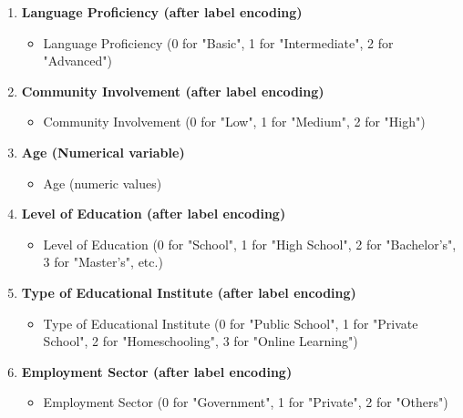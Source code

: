 \documentclass[conference]{IEEEtran}
\begin{document}
\begin{enumerate}[itemsep=0pt, parsep=0pt, topsep=0pt, partopsep=0pt]
    \item \textbf{Language Proficiency (after label encoding)}  
\begin{itemize}[itemsep=0pt, parsep=0pt, topsep=0pt, partopsep=0pt]
  \item  Language Proficiency (0 for "Basic", 1 for "Intermediate", 2 for "Advanced") 
\end{itemize}
    \item \textbf{Community Involvement (after label encoding)}  
\begin{itemize}[itemsep=0pt, parsep=0pt, topsep=0pt, partopsep=0pt]
  \item Community Involvement (0 for "Low", 1 for "Medium", 2 for "High") 
\end{itemize}
    \item \textbf{Age (Numerical variable)}  
\begin{itemize}[itemsep=0pt, parsep=0pt, topsep=0pt, partopsep=0pt]
  \item Age (numeric values)  
\end{itemize}
    \item \textbf{Level of Education (after label encoding)}  
\begin{itemize}[itemsep=0pt, parsep=0pt, topsep=0pt, partopsep=0pt]
  \item Level of Education (0 for "School", 1 for "High School", 2 for "Bachelor’s", 3 for "Master’s", etc.) 
\end{itemize}
    \item \textbf{Type of Educational Institute (after label encoding)} 
\begin{itemize}[itemsep=0pt, parsep=0pt, topsep=0pt, partopsep=0pt]
  \item  Type of Educational Institute (0 for "Public School", 1 for "Private School", 2 for "Homeschooling", 3 for "Online Learning") 
\end{itemize}
\item \textbf{Employment Sector (after label encoding)} 
\begin{itemize}[itemsep=0pt, parsep=0pt, topsep=0pt, partopsep=0pt]
  \item  Employment Sector (0 for "Government", 1 for "Private", 2 for "Others") 
\end{itemize}
\end{enumerate}
\end{document}
